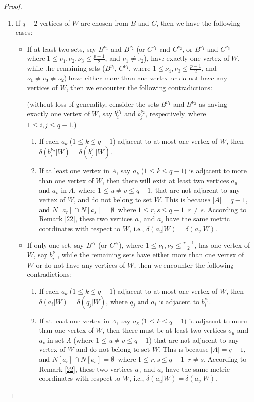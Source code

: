 \documentclass[10pt,a4paper]{amsart}
\begin{document}
\begin{proof}
\begin{enumerate}
\item If $q-2$ vertices of $W$ are chosen from  $B$ and $C$, then we have the following cases: 
\begin{itemize}
    \item If at least two sets, say \(B^{\nu_1}\) and \(B^{\nu_2}\) (or \(C^{\nu_1}\) and \(C^{\nu_2}\), or \(B^{\nu_1}\) and \(C^{\nu_3}\), where \(1 \leq \nu_1, \nu_2, \nu_3 \leq \frac{p-1}{2}\), and \(\nu_1 \neq \nu_2\)), have exactly one vertex of \(W\), while the remaining sets ($B^{\nu_3}$, $C^{\nu_4}$, where \(1\leq \nu_4, \nu_3 \leq \frac{p-1}{2}\), and $\nu_1 \neq \nu_3 \neq \nu_2$) have either more than one vertex or do not have any vertices of \(W\), then we encounter the following contradictions:
    
(without loss of generality, consider the sets \(B^{\nu_1}\) and \(B^{\nu_2}\) as having exactly one vertex of \(W\), say \(b^{\nu_1}_i\) and \(b^{\nu_2}_j\), respectively, where \(1 \leq i, j \leq q-1\).)
    \begin{enumerate}
        \item If each $a_k$ ($1\leq k \leq q-1$) adjacent to at most one vertex of $W$, then $\delta( b^{\nu_2}_i|W) =\delta( b^{\nu_1}_{j}|W)$.
\item If at least one vertex in $A$, say $a_k$ ($1\leq k \leq q-1$) is adjacent to more than one vertex of $W$, then there will exist at least two vertices $a_u$ and $a_v$ in $A$, where $1 \leq u \neq v \leq q-1$, that are not adjacent to any vertex of $W$, and do not belong to set $W$. This is because $|A|=q-1$, and $N[a_r]\cap N[a_s]=\emptyset$, where $1\leq r,s\leq q-1$, $r\neq s$. According to Remark \ref{22}, these two vertices $a_u$ and $a_v$ have the same metric coordinates with respect to $W$, i.e., $\delta(a_u|W) = \delta(a_v|W)$.
 \end{enumerate}
    \item If only one set, say $B^{\nu_1}$ (or $C^{\nu_2}$), where $1 \leq \nu_1, \nu_2 \leq \frac{p-1}{2}$, has one vertex of $W$, say $b^{\nu_1}_i$, while the remaining sets have either more than one vertex of $W$ or do not have any vertices of $W$, then we encounter the following contradictions:
    \begin{enumerate}
        \item If each $a_k$ ($1\leq k \leq q-1$)  adjacent to at most one vertex of $W$, then $\delta(a_i|W) = \delta(q_j|W)$, where $q_j$ and $a_i$ is adjacent to $b^{\nu_1}_i$.
        \item If at least one vertex in $A$, say $a_k$ ($1\leq k \leq q-1$) is adjacent to more than one vertex of $W$, then there must be at least two vertices $a_u$ and $a_v$ in set $A$ (where $1 \leq u \neq v \leq q-1$) that are not adjacent to any vertex of $W$ and do not belong to set $W$. This is because $|A|=q-1$, and $N[a_r]\cap N[a_s]=\emptyset$, where $1\leq r,s\leq q-1$, $r\neq s$. According to Remark \ref{22}, these two vertices $a_u$ and $a_v$ have the same metric coordinates with respect to $W$, i.e., $\delta(a_u|W) = \delta(a_v|W)$.

\end{enumerate}
\end{itemize}
\end{enumerate}
\end{proof}
\end{document}
